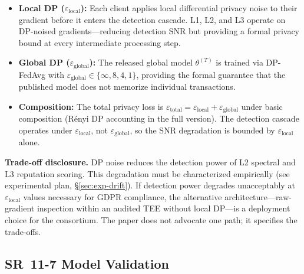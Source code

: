 \documentclass[10pt,journal]{IEEEtran}
\begin{document}
\begin{itemize}
  \item \textbf{Local DP ($\varepsilon_{\text{local}}$):} Each client applies local differential privacy noise to their gradient before it enters the detection cascade. L1, L2, and L3 operate on DP-noised gradients---reducing detection SNR but providing a formal privacy bound at every intermediate processing step.
  \item \textbf{Global DP ($\varepsilon_{\text{global}}$):} The released global model $\theta^{(T)}$ is trained via DP-FedAvg with $\varepsilon_{\text{global}} \in \{\infty, 8, 4, 1\}$, providing the formal guarantee that the published model does not memorize individual transactions.
  \item \textbf{Composition:} The total privacy loss is $\varepsilon_{\text{total}} = \varepsilon_{\text{local}} + \varepsilon_{\text{global}}$ under basic composition (R\'enyi DP accounting in the full version). The detection cascade operates under $\varepsilon_{\text{local}}$, not $\varepsilon_{\text{global}}$, so the SNR degradation is bounded by $\varepsilon_{\text{local}}$ alone.
\end{itemize}

\textbf{Trade-off disclosure.} DP noise reduces the detection power of L2 spectral and L3 reputation scoring. This degradation must be characterized empirically (see experimental plan, \S\ref{sec:exp-drift}). If detection power degrades unacceptably at $\varepsilon_{\text{local}}$ values necessary for GDPR compliance, the alternative architecture---raw-gradient inspection within an audited TEE without local DP---is a deployment choice for the consortium. The paper does not advocate one path; it specifies the trade-offs.

\subsection{SR~11-7 Model Validation}

\begin{table}[t]
\centering
\caption{SR~11-7 model risk management mapping.}
\label{tab:sr117}
\footnotesize
{}
\end{table}
\end{document}

